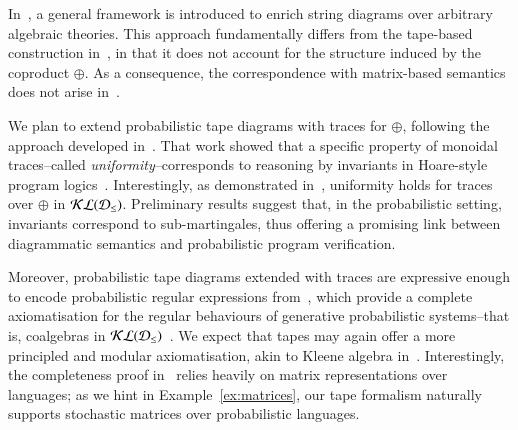 In~\cite{villoria2024enriching}, a general framework is introduced to enrich string diagrams over arbitrary algebraic theories. This approach fundamentally differs from the tape-based construction in~\cite{bonchi2025tapediagramsmonoidalmonads}, in that it does not account for the structure induced by the coproduct \( \oplus \). As a consequence, the correspondence with matrix-based semantics %
does not arise in~\cite{villoria2024enriching}.

We plan to extend probabilistic tape diagrams with traces for \( \oplus \), following the approach developed in~\cite{bonchi2024diagrammatic}. That work showed that a specific property of monoidal traces--called \emph{uniformity}--corresponds to reasoning by invariants in Hoare-style program logics~\cite{hoare1969axiomatic}. Interestingly, as demonstrated in~\cite{jacobs2010coalgebraic}, uniformity holds for traces over \( \oplus \) in \( \mathcal{KL}(\mathcal{D}_{\leq}) \). Preliminary results suggest that, in the probabilistic setting, invariants correspond to sub-martingales, thus offering a promising link between diagrammatic semantics and probabilistic program verification.

Moreover, probabilistic tape diagrams extended with traces are expressive enough to encode probabilistic regular expressions from~\cite{DBLP:conf/lics/RozowskiS24}, which provide a complete axiomatisation for the regular behaviours of generative probabilistic systems--that is, coalgebras in \( \mathcal{KL}(\mathcal{D}_{\leq}) \)~\cite{hasuo2007generic}. We expect that tapes may again offer a more principled and modular axiomatisation, akin to Kleene algebra in~\cite{Kozen94acompleteness}. Interestingly, the completeness proof in~\cite{Kozen94acompleteness} relies heavily on matrix representations over languages; as we hint in Example~\ref{ex:matrices}, our tape formalism naturally supports stochastic matrices over probabilistic languages.



